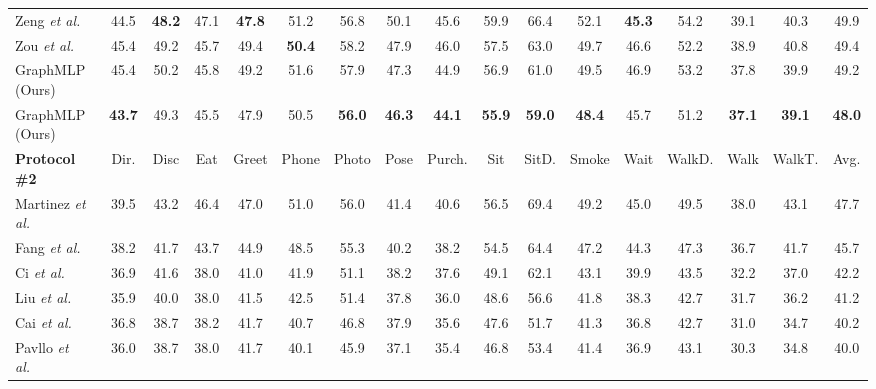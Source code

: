 \documentclass[lettersize,journal]{IEEEtran}
\begin{document}
\begin{table*}[tb]
{\begin{tabular}{@{}l|ccccccccccccccc|c@{}}
  Zeng \emph{et al.}~\cite{zeng2020srnet} &44.5& \textbf{48.2} &47.1 &\textbf{47.8} &51.2 &{56.8} &50.1& {45.6}& 59.9 &66.4 &52.1 &\textbf{45.3} &54.2 &39.1 &40.3 &49.9 \\

  Zou \emph{et al.}~\cite{zou2021modulated} &45.4 &49.2 &45.7 &49.4 &\textbf{50.4} &58.2 &47.9 &46.0 &57.5 &63.0 &49.7 &46.6 &52.2 &38.9 &40.8 &49.4 \\

  \midrule
  
  GraphMLP (Ours) &{45.4} &{50.2} &{45.8} &{49.2} &{51.6} &{57.9} &{47.3} &{44.9} &{56.9} &{61.0} &{49.5} &{46.9} &{53.2} &{37.8} &{39.9} &{49.2} \\

  GraphMLP (Ours) &\textbf{43.7} &{49.3} &{45.5} &{47.9} &{50.5} &\textbf{56.0} &\textbf{46.3} &\textbf{44.1} &\textbf{55.9} &\textbf{59.0} &\textbf{48.4} &{45.7} &{51.2} &\textbf{37.1} &\textbf{39.1} &\textbf{48.0} \\

  \toprule
  \textbf{Protocol \#2} & Dir. & Disc & Eat & Greet & Phone & Photo & Pose & Purch. & Sit & SitD. & Smoke & Wait & WalkD. & Walk & WalkT. & Avg. \\
  \midrule

  Martinez \emph{et al.}~\cite{simplebaseline} &39.5 &43.2 &46.4 &47.0 &51.0 &56.0 &41.4 &40.6 &56.5 &69.4 &49.2 &45.0 &49.5 &38.0 &43.1 &47.7 \\

  Fang \emph{et al.}~\cite{fang2018learning} &38.2 &41.7 &43.7 &44.9 &48.5 &55.3 &40.2 &38.2 &54.5 &64.4 &47.2 &44.3 &47.3 &36.7 &41.7 &45.7 \\

  Ci \emph{et al.}~\cite{ci2019optimizing} &36.9& 41.6& 38.0& 41.0& 41.9 &51.1 &38.2& 37.6& 49.1 &62.1 &43.1& 39.9& 43.5& 32.2& 37.0& 42.2 \\

  Liu \emph{et al.}~\cite{liu2020comprehensive} &35.9 &40.0 &38.0 &41.5 &42.5 &51.4 &37.8 &36.0 &48.6 &56.6 &41.8 &38.3 &42.7 &31.7 &36.2 &41.2 \\

  Cai \emph{et al.}~\cite{stgcn} &36.8 &38.7 &38.2 &41.7 &40.7 &46.8 &37.9 &35.6 &47.6 &51.7 &41.3 &36.8 &42.7 &31.0 &34.7 &40.2 \\

  Pavllo \emph{et al.}~\cite{videopose} &36.0 &38.7 &38.0 &41.7 &40.1 &45.9 &37.1 &35.4 &46.8 &53.4 &41.4 &36.9 &43.1 &30.3 &34.8 &40.0 \\


\end{tabular}}
\end{table*}
\end{document}
